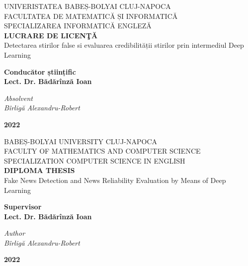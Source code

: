 \begin{titlepage}
  \begin{center}
    \normalsize{
      {UNIVERISTATEA BABEȘ-BOLYAI CLUJ-NAPOCA}\\
      {FACULTATEA DE MATEMATICĂ ȘI INFORMATICĂ}\\
      {SPECIALIZAREA INFORMATICĂ ENGLEZĂ}
    }\\
    [2.5cm]
    \Large{\textbf{LUCRARE DE LICENŢĂ}}\\
    [0.75cm]
    \Huge{ Detectarea stirilor false si evaluarea credibilității stirilor prin intermediul Deep Learning }\\
    [2.5cm]
  \end{center}

  \begin{flushleft}
    \large{
      {\textbf{Conducător științific}}\\
      {\textbf{Lect. Dr. Bădărînză Ioan}}
    }\\
    [1cm]
  \end{flushleft}

  \begin{flushright}
    \large{
      {\textit{Absolvent}}\\
      {\textit{Bîrligă Alexandru-Robert}}
    }\\
    [2cm]
  \end{flushright}

  \begin{center}
    \large{\textbf{2022}}
  \end{center}
\end{titlepage}

\begin{titlepage}
  \begin{center}
    \normalsize{
      {BABEȘ-BOLYAI UNIVERSITY CLUJ-NAPOCA}\\
      {FACULTY OF MATHEMATICS AND COMPUTER SCIENCE}\\
      {SPECIALIZATION COMPUTER SCIENCE IN ENGLISH}
    }\\
    [2.5cm]
    \Large{\textbf{DIPLOMA THESIS}}\\
    [0.75cm]
    \Huge{Fake News Detection and News Reliability Evaluation by Means of Deep Learning}\\
    [2.5cm]
  \end{center}

  \begin{flushleft}
    \large{
      {\textbf{Supervisor}}\\
      {\textbf{Lect. Dr. Bădărînză Ioan}}
    }\\
    [1cm]
  \end{flushleft}

  \begin{flushright}
    \large{
      {\textit{Author}}\\
      {\textit{Bîrligă Alexandru-Robert}}
    }\\
    [3cm]
  \end{flushright}

  \begin{center}
    \large{\textbf{2022}}
  \end{center}
\end{titlepage}